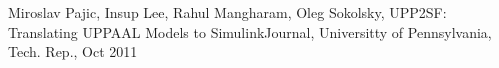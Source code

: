 \documentclass[12pt,letterpaper]{report}
\begin{document}
\pagebreak



\renewcommand\bibname{References}
\begin{thebibliography}{9}
Miroslav Pajic, Insup Lee, Rahul Mangharam, Oleg Sokolsky, UPP2SF: Translating UPPAAL Models to SimulinkJournal, Universitty of Pennsylvania, Tech. Rep., Oct 2011
\end{thebibliography}
\end{document}
